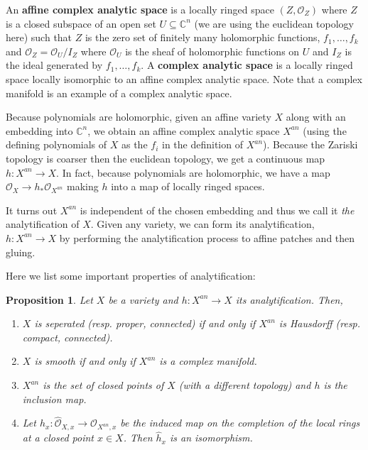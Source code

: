 \documentclass[a4paper]{article}
\newcommand{\OO}{\mathcal{O}}
\newcommand{\C}{\mathbb{C}}
\newtheorem{proposition}[theorem]{Proposition}
\numberwithin{theorem}{section}
\numberwithin{equation}{section}
\begin{document}
An \textbf{affine complex analytic space} is a locally ringed space $(Z,\OO_Z)$ where $Z$ is a closed subspace of an open set $U \subseteq \C^n$ (we are using the euclidean topology here) such that $Z$ is the zero set of finitely many holomorphic functions, $f_1,\dots,f_k$ and $\OO_Z = \OO_U/I_Z$ where $\OO_U$ is the sheaf of holomorphic functions on $U$ and $I_Z$ is the ideal generated by $f_1,\dots,f_k$. A \textbf{complex analytic space} is a locally ringed space locally isomorphic to an affine complex analytic space. Note that a complex manifold is an example of a complex analytic space.

Because polynomials are holomorphic, given an affine variety $X$ along with an embedding into $\C^n$, we obtain an affine complex analytic space $X^{an}$ (using the defining polynomials of $X$ as the $f_i$ in the definition of $X^{an}$). Because the Zariski topology is coarser then the euclidean topology, we get a continuous map $h: X^{an} \rightarrow X$. In fact, because polynomials are holomorphic, we have a map $\OO_X \rightarrow h_* \OO_{X^{an}}$ making $h$ into a map of locally ringed spaces.

It turns out $X^{an}$ is independent of the chosen embedding and thus we call it \textit{the} analytification of $X$. Given any variety, we can form its analytification, $h: X^{an} \rightarrow X$ by performing the analytification process to affine patches and then gluing.

Here we list some important properties of analytification:

\begin{proposition}
    Let $X$ be a variety and $h: X^{an} \rightarrow X$ its analytification. Then,
    \begin{enumerate}
        \item $X$ is seperated (resp. proper, connected) if and only if $X^{an}$ is Hausdorff (resp. compact, connected).
        \item $X$ is smooth if and only if $X^{an}$ is a complex manifold.
        \item $X^{an}$ is the set of closed points of $X$ (with a different topology) and $h$ is the inclusion map.
        \item Let $\hat{h}_x : \hat{\OO}_{X,x} \rightarrow \hat{\OO}_{X^{an},x}$ be the induced map on the completion of the local rings at a closed point $x \in X$. Then $\hat{h}_x$ is an isomorphism.
    \end{enumerate}
    
\end{proposition}
\end{document}

